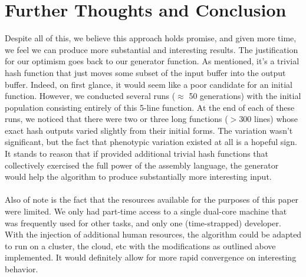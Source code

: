 \documentclass{article}
\begin{document}
\section{Further Thoughts and Conclusion}
Despite all of this, we believe this approach holds promise, and given more time, we feel we can produce more substantial and interesting results. The justification for our optimism goes back to our generator function. As mentioned, it's a trivial hash function that just moves some subset of the input buffer into the output buffer. Indeed, on first glance, it would seem like a poor candidate for an initial function. However, we conducted several runs ($\approx$ 50 generations) with the initial population consisting entirely of this 5-line function. At the end of each of these runs, we noticed that there were two or three long functions ($>$300 lines) whose exact hash outputs varied slightly from their initial forms. The variation wasn't significant, but the fact that phenotypic variation existed at all is a hopeful sign. It stands to reason that if provided additional trivial hash functions that collectively exercised the full power of the assembly language, the generator would help the algorithm to produce substantially more interesting input.

\paragraph{}
Also of note is the fact that the resources available for the purposes of this paper were limited. We only had part-time access to a single dual-core machine that was frequently used for other tasks, and only one (time-strapped) developer.  With the injection of additional human resources, the algorithm could be adapted to run on a cluster, the cloud, etc with the modifications as outlined above implemented. It would definitely allow for more rapid convergence on interesting behavior.

\end{document}
